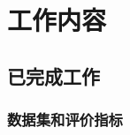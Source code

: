 \documentclass[CJK,aspectratio=169]{beamer}  %
\begin{document}
	\section{工作内容}
	
	\subsection{已完成工作}
	
%		
%		
%		
	
	
	\subsubsection{数据集和评价指标}
	
\end{document}
